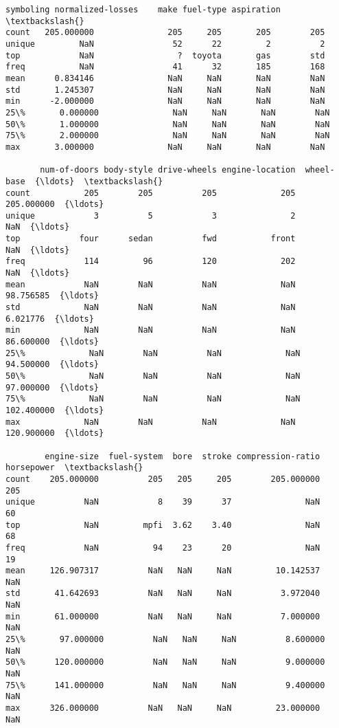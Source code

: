 \documentclass[11pt]{article}
\makeatletter
\newcommand{\boxspacing}{\kern\kvtcb@left@rule\kern\kvtcb@boxsep}
\newcommand{\prompt}[4]{
        \ttfamily\llap{{\color{#2}[#3]:\hspace{3pt}#4}}\vspace{-\baselineskip}
    }
\makeatother
\begin{document}
            \begin{tcolorbox}[breakable, size=fbox, boxrule=.5pt, pad at break*=1mm, opacityfill=0]
\prompt{Out}{outcolor}{15}{\boxspacing}
\begin{Verbatim}[commandchars=\\\{\}]
         symboling normalized-losses    make fuel-type aspiration  \textbackslash{}
count   205.000000               205     205       205        205
unique         NaN                52      22         2          2
top            NaN                 ?  toyota       gas        std
freq           NaN                41      32       185        168
mean      0.834146               NaN     NaN       NaN        NaN
std       1.245307               NaN     NaN       NaN        NaN
min      -2.000000               NaN     NaN       NaN        NaN
25\%       0.000000               NaN     NaN       NaN        NaN
50\%       1.000000               NaN     NaN       NaN        NaN
75\%       2.000000               NaN     NaN       NaN        NaN
max       3.000000               NaN     NaN       NaN        NaN

       num-of-doors body-style drive-wheels engine-location  wheel-base  {\ldots}  \textbackslash{}
count           205        205          205             205  205.000000  {\ldots}
unique            3          5            3               2         NaN  {\ldots}
top            four      sedan          fwd           front         NaN  {\ldots}
freq            114         96          120             202         NaN  {\ldots}
mean            NaN        NaN          NaN             NaN   98.756585  {\ldots}
std             NaN        NaN          NaN             NaN    6.021776  {\ldots}
min             NaN        NaN          NaN             NaN   86.600000  {\ldots}
25\%             NaN        NaN          NaN             NaN   94.500000  {\ldots}
50\%             NaN        NaN          NaN             NaN   97.000000  {\ldots}
75\%             NaN        NaN          NaN             NaN  102.400000  {\ldots}
max             NaN        NaN          NaN             NaN  120.900000  {\ldots}

        engine-size  fuel-system  bore  stroke compression-ratio horsepower  \textbackslash{}
count    205.000000          205   205     205        205.000000        205
unique          NaN            8    39      37               NaN         60
top             NaN         mpfi  3.62    3.40               NaN         68
freq            NaN           94    23      20               NaN         19
mean     126.907317          NaN   NaN     NaN         10.142537        NaN
std       41.642693          NaN   NaN     NaN          3.972040        NaN
min       61.000000          NaN   NaN     NaN          7.000000        NaN
25\%       97.000000          NaN   NaN     NaN          8.600000        NaN
50\%      120.000000          NaN   NaN     NaN          9.000000        NaN
75\%      141.000000          NaN   NaN     NaN          9.400000        NaN
max      326.000000          NaN   NaN     NaN         23.000000        NaN


\end{Verbatim}
\end{tcolorbox}
\end{document}
